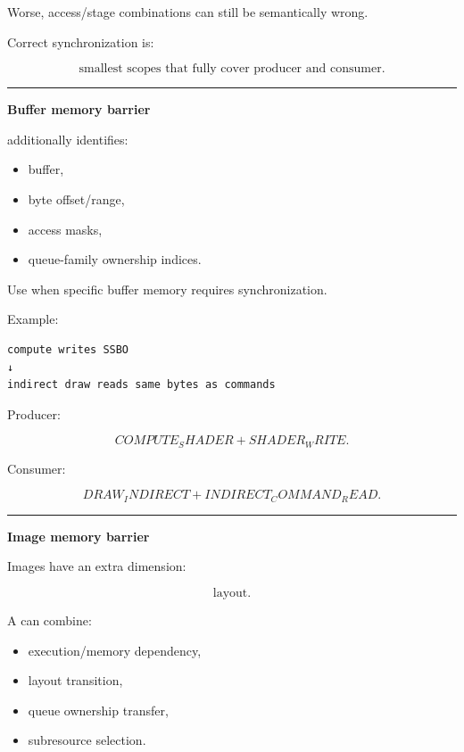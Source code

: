 Worse, access/stage combinations can still be semantically wrong.

Correct synchronization is:

\[
\boxed{
\text{smallest scopes that fully cover producer and consumer}.
}
\]

\begin{center}\rule{0.5\linewidth}{0.5pt}\end{center}

\textbf{Buffer memory barrier}

 additionally identifies:

\begin{itemize}
\tightlist
\item
  buffer,
\item
  byte offset/range,
\item
  access masks,
\item
  queue-family ownership indices.
\end{itemize}

Use when specific buffer memory requires synchronization.

Example:

\begin{verbatim}
compute writes SSBO
↓
indirect draw reads same bytes as commands
\end{verbatim}

Producer:

\[
COMPUTE_SHADER
+
SHADER_WRITE.
\]

Consumer:

\[
DRAW_INDIRECT
+
INDIRECT_COMMAND_READ.
\]

\begin{center}\rule{0.5\linewidth}{0.5pt}\end{center}

\textbf{Image memory barrier}

Images have an extra dimension:

\[
\boxed{\text{layout}.}
\]

A  can combine:

\begin{itemize}
\tightlist
\item
  execution/memory dependency,
\item
  layout transition,
\item
  queue ownership transfer,
\item
  subresource selection.
\end{itemize}

